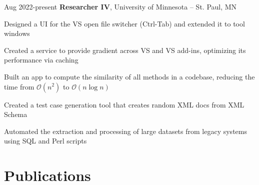 \documentclass{resume}
\begin{document}
        \vspace{0.2 cm}

        \begin{twocolentry}{
            Aug 2022-present
        }
            \textbf{Researcher IV}, University of Minnesota -- St. Paul, MN
        \end{twocolentry}

        \vspace{0.10 cm}
        \begin{onecolentry}
            \begin{highlights}
                \item Designed a UI for the VS open file switcher (Ctrl-Tab) and extended it to tool windows
                \item Created a service to provide gradient across VS and VS add-ins, optimizing its performance via caching
                \item Built an app to compute the similarity of all methods in a codebase, reducing the time from $\mathcal{O}(n^2)$ to $\mathcal{O}(n \log n)$
                \item Created a test case generation tool that creates random XML docs from XML Schema
                \item Automated the extraction and processing of large datasets from legacy systems using SQL and Perl scripts
            \end{highlights}
        \end{onecolentry}



    
    \section{Publications}
\end{document}
